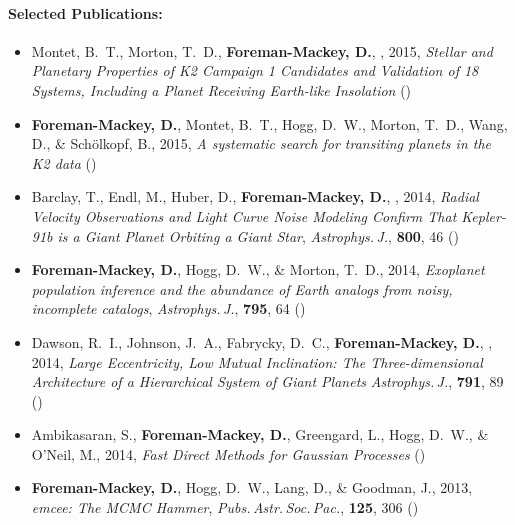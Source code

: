 \documentclass[12pt]{article}
\begin{document}
\paragraph{Selected Publications:}
\begin{itemize}\setlength{\itemsep}{0pt}

\item Montet, B.~T., Morton, T.~D., {\bf Foreman-Mackey, D.}, \etal, 2015,
    \emph{Stellar and Planetary Properties of K2 Campaign 1 Candidates and
          Validation of 18 Systems, Including a Planet Receiving Earth-like
          Insolation} ()

\item {\bf Foreman-Mackey, D.}, Montet, B.~T., Hogg, D.~W., Morton, T.~D.,
    Wang, D., \& Sch\"olkopf, B., 2015,
    \emph{A systematic search for transiting planets in the K2 data}
    ()

\item Barclay, T., Endl, M.,  Huber, D., {\bf Foreman-Mackey, D.}, \etal, 2014,
    \emph{Radial Velocity Observations and Light Curve Noise Modeling Confirm
          That Kepler-91b is a Giant Planet Orbiting a Giant Star},
    \textit{Astrophys.\,J.}, \textbf{800}, 46 ()

\item {\bf Foreman-Mackey, D.}, Hogg, D.~W., \& Morton, T.~D., 2014,
    \emph{Exoplanet population inference and the abundance of Earth analogs
          from noisy, incomplete catalogs},
    \textit{Astrophys.\,J.}, \textbf{795}, 64 ()

\item Dawson, R.~I., Johnson,  J.~A., Fabrycky, D.~C.,
    {\bf Foreman-Mackey, D.}, \etal, 2014,
    \emph{Large Eccentricity, Low Mutual Inclination: The Three-dimensional
          Architecture of a Hierarchical System of Giant Planets}
    \textit{Astrophys.\,J.}, \textbf{791}, 89 ()

\item Ambikasaran, S., {\bf Foreman-Mackey, D.}, Greengard, L., Hogg, D.~W.,
    \& O'Neil, M., 2014,
    \emph{Fast Direct Methods for Gaussian Processes} ()

\item {\bf Foreman-Mackey, D.}, Hogg, D.~W., Lang, D., \& Goodman, J., 2013,
    \emph{emcee: The MCMC Hammer},
    \textit{Pubs.\,Astr.\,Soc.\,Pac.}, \textbf{125}, 306 ()

\end{itemize}
\end{document}
